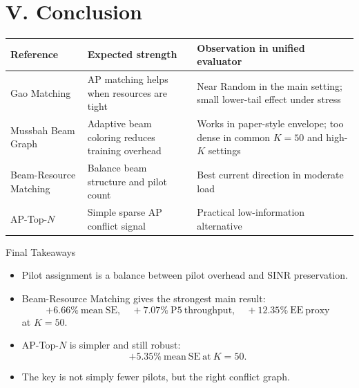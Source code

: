 \documentclass[aspectratio=169, 10pt]{beamer}
\newcommand{\methodBRM}{Beam-Resource Matching}
\newcommand{\methodTopN}{AP-Top-\(N\)}
\begin{document}
\section{V. Conclusion}
\OnlyTitle
\begin{frame}{\insertsectionhead}
    \scriptsize
    \begin{tabular}{p{}p{}p{}}
        \toprule
        Reference          & Expected strength                                & Observation in unified evaluator                                                    \\
        \midrule
        Gao Matching       & AP matching helps when resources are tight       & Near Random in the main setting; small lower-tail effect under stress               \\
        Mussbah Beam Graph & Adaptive beam coloring reduces training overhead & Works in paper-style envelope; too dense in common \(K=50\) and high-\(K\) settings \\
        \methodBRM{}       & Balance beam structure and pilot count           & Best current direction in moderate load                                             \\
        \methodTopN{}      & Simple sparse AP conflict signal                 & Practical low-information alternative                                               \\
        \bottomrule
    \end{tabular}
\end{frame}

\begin{frame}{Final Takeaways}
    \begin{itemize}
        \setlength{\itemsep}{1em}
        \item Pilot assignment is a balance between pilot overhead and SINR preservation.
        \item \methodBRM{} gives the strongest main result:
              \[
                  +6.66\% \ \mathrm{mean\ SE}, \quad
                  +7.07\% \ \mathrm{P5\ throughput}, \quad
                  +12.35\% \ \mathrm{EE\ proxy}
              \]
              at \(K=50\).
        \item \methodTopN{} is simpler and still robust:
              \[
                  +5.35\% \ \mathrm{mean\ SE\ at}\ K=50.
              \]
        \item The key is not simply fewer pilots, but the right conflict graph.
    \end{itemize}
\end{frame}
\end{document}
